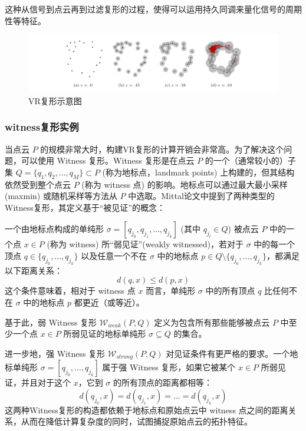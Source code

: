 这种从信号到点云再到过滤复形的过程，使得可以运用持久同调来量化信号的周期性等特征。

\begin{figure}[thbp!]
    \centering
    \includegraphics[width=1.0\textwidth]{figure/点云生成示意图.png}
    \caption{VR复形示意图}
    \label{fig:tde_example}
\end{figure}


\subsubsection{witness复形实例}
当点云 $P$ 的规模非常大时，构建VR复形的计算开销会非常高。为了解决这个问题，可以使用 Witness 复形\cite{de2004topological}。Witness 复形是在点云 $P$ 的一个（通常较小的）子集 $Q = \{q_1, q_2, \ldots, q_M\} \subset P$ (称为地标点，landmark points) 上构建的，但其结构依然受到整个点云 $P$ (称为 witness 点) 的影响。地标点可以通过最大最小采样 (maxmin) 或随机采样等方法从 $P$ 中选取。Mittal\cite{mittal2017topological}论文中提到了两种类型的Witness复形，其定义基于“被见证”的概念：

一个由地标点构成的单纯形 $\sigma = [q_{j_0}, q_{j_1}, \ldots, q_{j_k}]$ (其中 $q_{j_l} \in Q$) 被点云 $P$ 中的一个点 $x \in P$ (称为 witness) 所“弱见证”(weakly witnessed)，若对于 $\sigma$ 中的每一个顶点 $q \in \{q_{j_0}, \ldots, q_{j_k}\}$ 以及任意一个不在 $\sigma$ 中的地标点 $p \in Q \setminus \{q_{j_0}, \ldots, q_{j_k}\}$，都满足以下距离关系：
\begin{equation}
    d(q, x) \le d(p, x)
\end{equation}
这个条件意味着，相对于 witness 点 $x$ 而言，单纯形 $\sigma$ 中的所有顶点 $q$ 比任何不在 $\sigma$ 中的地标点 $p$ 都更近（或等近）。

基于此，弱 Witness 复形 $\mathcal{W}_{weak}(P, Q)$ 定义为包含所有那些能够被点云 $P$ 中至少一个点 $x \in P$ 所弱见证的地标单纯形 $\sigma \subseteq Q$ 的集合。

进一步地，强 Witness 复形 $\mathcal{W}_{strong}(P, Q)$ 对见证条件有更严格的要求。一个地标单纯形 $\sigma = [q_{j_0}, \ldots, q_{j_k}]$ 属于强 Witness 复形，如果它被某个 $x \in P$ 所弱见证，并且对于这个 $x$，它到 $\sigma$ 的所有顶点的距离都相等：
\begin{equation}
    d(q_{j_0}, x) = d(q_{j_1}, x) = \ldots = d(q_{j_k}, x)
\end{equation}
这两种Witness复形的构造都依赖于地标点和原始点云中 witness 点之间的距离关系，从而在降低计算复杂度的同时，试图捕捉原始点云的拓扑特征\cite{1023810871.nh}。

